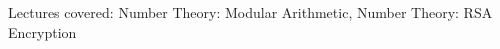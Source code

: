 \documentclass[handout]{mcs}
\begin{document}
\renewcommand{\reading}{
  Chapter~\bref{number_theory_chap}.\ ~\bref{modular_arithmeric_sec}.\ \emph{Modular Arithmetic}\ through~\bref{RSA_sec}.\ \emph{RSA Encryption}
  }


\begin{staffnotes}
Lectures covered: Number Theory: Modular Arithmetic, Number Theory: RSA Encryption
\end{staffnotes}











\end{document}
